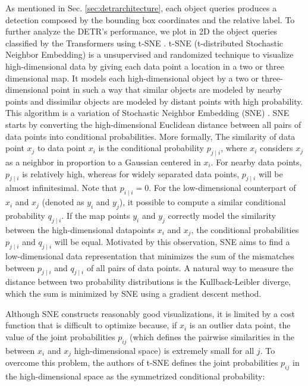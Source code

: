 \newpage

As mentioned in Sec. \ref{sec:detrarchitecture}, each object queries produces a detection composed by the bounding box coordinates and the relative label. To further analyze the DETR's performance, we plot in 2D the object queries classified by the Transformers using t-SNE \cite{tsne}. t-SNE (t-distributed Stochastic Neighbor Embedding) is a unsupervised and randomized technique to visualize high-dimensional data by giving each data point a location in a two or three dimensional map. It models each high-dimensional object by a two or three-dimensional point in such a way that similar objects are modeled by nearby points and dissimilar objects are modeled by distant points with high probability. This algorithm is a variation of Stochastic Neighbor Embedding (SNE) \cite{sne}. SNE starts by converting the high-dimensional Euclidean distance between all pairs of data points into conditional probabilities. More formally,  The similarity of data point $x_j$ to data point $x_i$ is the conditional probability $p_{j \mid i}$, where $x_i$ considers $x_j$ as a neighbor in proportion to a Gaussian centered in $x_i$. For nearby data points, $p_{j \mid i}$
is relatively high, whereas for widely separated data points, $p_{j \mid i}$ will be almost infinitesimal. Note that $p_{i \mid i} = 0$. For the low-dimensional counterpart of  $x_i$ and $x_j$ (denoted as $y_i$ and $y_j$), it possible to compute a similar conditional probability  $q_{j \mid i}$.
If the map points $y_i$ and $y_j$ correctly model the similarity between the high-dimensional datapoints $x_i$ and $x_j$, the conditional probabilities $p_{j \mid i}$ and $q_{j \mid i}$ will be equal. Motivated by this observation, SNE aims to find a low-dimensional data representation that minimizes the sum of the mismatches between $p_{j \mid i}$ and $q_{j \mid i}$ of all pairs of data points. A natural way to measure the distance between two probability distributions is the Kullback-Leibler diverge, which the sum is minimized by SNE using a gradient descent method.

Although SNE constructs reasonably good visualizations, it is limited by a cost function that is difficult to optimize because, if $x_i$ is an outlier data point, the value of the joint probabilities $p_{i j}$ (which defines the pairwise similarities in the between $x_i$ and $x_j$ high-dimensional space) is extremely small for all $j$. To overcome this problem, the authors of t-SNE defines the joint probabilities $p_{i j}$ in the high-dimensional space as the symmetrized conditional probability:

